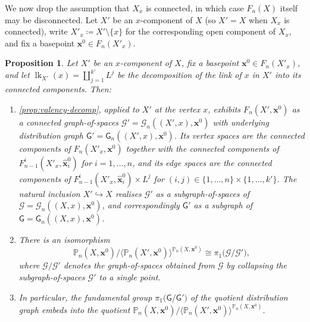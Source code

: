 \documentclass[reqno]{amsart}
\newtheorem{proposition}[theorem]{Proposition}
\theoremstyle{definition}
\newcommand\bfx{\mathbf{x}}
\newcommand\cG{\mathcal{G}}
\newcommand\sfG{\mathsf{G}}
\newcommand{\PB}{\mathbb{P}}
\newcommand{\co}[1]{\mathopen{\langle}#1\mathclose{\rangle}} %
\newcommand{\base}{\bfx^0}
\DeclareMathOperator{\lk}{lk}
\numberwithin{equation}{section}
\begin{document}
We now drop the assumption that \(X_x\) is connected, in which case
\(F_n(X)\) itself may be disconnected. Let \(X'\) be an \(x\)-component
of \(X\) (so \(X'=X\) when \(X_x\) is connected), write
\(X'_x\coloneqq X'\setminus\{x\}\) for the corresponding open
component of \(X_x\), and fix a basepoint \(\base\in F_n(X'_x)\).

\begin{proposition}\label{prop:disconnected-graph-of-spaces}
Let \(X'\) be an \(x\)-component of \(X\), fix a basepoint
\(\base\in F_n(X'_x)\), and let
\(\lk_{X'}(x)=\coprod_{j=1}^{k'} L^j\) be the decomposition of the
link of \(x\) in \(X'\) into its connected components. Then:
\begin{enumerate}[label=(\roman*),leftmargin=2em]
    \item \cref{prop:valency-decomp}, applied to \(X'\)
          at the vertex \(x\), exhibits \(F_n(X',\base)\) as a
          \emph{connected} graph-of-spaces
          \(\cG'=\cG_n((X',x),\base)\) with underlying distribution graph
          \(\sfG'=\sfG_n((X',x),\base)\). Its vertex spaces are the
          connected components of \(F_n(X'_x,\base)\) together with
          the connected components of
          \(F_{n-1}^i(X'_x,\hat{\bfx}^0_i)\) for \(i=1,\dots,n\), and
          its edge spaces are the connected components of
          \(F_{n-1}^i(X'_x,\hat{\bfx}^0_i)\times L^j\) for
          \((i,j)\in\{1,\dots,n\}\times\{1,\dots,k'\}\). The natural
          inclusion \(X'\hookrightarrow X\) realises
          \(\cG'\) as a \emph{subgraph-of-spaces}
          of \(\cG=\cG_n((X,x),\base)\), and correspondingly
          \(\sfG'\) as a subgraph of \(\sfG=\sfG_n((X,x),\base)\).
    \item There is an isomorphism
          \[
          \PB_n(X,\base)\big/\co{\PB_n(X',\base)}^{\PB_n(X,\base)}
          \cong
          \pi_1\bigl(\cG/\cG'\bigr),
          \]
          where
          \(\cG/\cG'\)
          denotes the graph-of-spaces obtained from
          \(\cG\) by collapsing the
          subgraph-of-spaces \(\cG'\) to a
          single point.
    \item In particular, the fundamental group
          \(\pi_1\bigl(\sfG/\sfG'\bigr)\) of the
          quotient distribution graph embeds into the quotient
          \(\PB_n(X,\base)\big/\co{\PB_n(X',\base)}^{\PB_n(X,\base)}\).
\end{enumerate}
\end{proposition}
\end{document}
